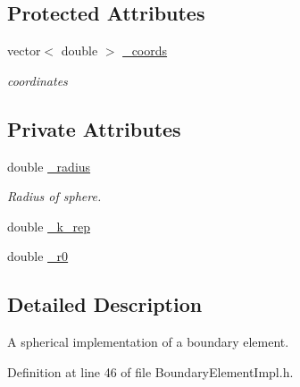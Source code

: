 \subsection*{Protected Attributes}
\begin{DoxyCompactItemize}
\item 
vector$<$ double $>$ \hyperlink{classBoundaryElement_ab51302e10e3e2def98438234ba5bf801}{\+\_\+coords}
\begin{DoxyCompactList}\small\item\em coordinates \end{DoxyCompactList}\end{DoxyCompactItemize}
\subsection*{Private Attributes}
\begin{DoxyCompactItemize}
\item 
double \hyperlink{classSphereBoundaryElement_a292f2562c66472f77e516ea19121f360}{\+\_\+radius}
\begin{DoxyCompactList}\small\item\em Radius of sphere. \end{DoxyCompactList}\item 
double \hyperlink{classSphereBoundaryElement_a4bca6baf26a3fb1718aaaed348646a58}{\+\_\+k\+\_\+rep}
\item 
double \hyperlink{classSphereBoundaryElement_a3e80ad9724c8ae7ff03631b4f2f84d1b}{\+\_\+r0}
\end{DoxyCompactItemize}


\subsection{Detailed Description}
A spherical implementation of a boundary element. 

Definition at line 46 of file Boundary\+Element\+Impl.\+h.



